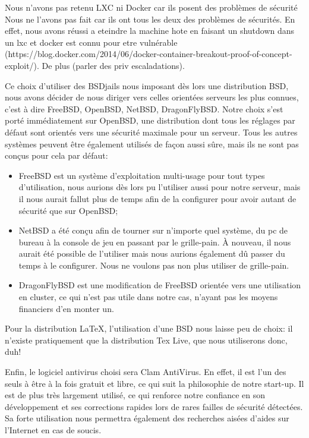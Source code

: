 \documentclass[10pt,a4paper]{article}
\begin{document}
Nous n'avons pas retenu LXC ni Docker car ils posent des problèmes de sécurité
Nous ne l'avons pas fait car ils ont tous les deux des problèmes de sécurités.
En effet, nous avons réussi a eteindre la machine hote en faisant un shutdown dans un lxc et docker est connu pour etre vulnérable (https://blog.docker.com/2014/06/docker-container-breakout-proof-of-concept-exploit/).
De plus (parler des priv escaladations).


Ce choix d'utiliser des BSDjails nous imposant dès lors une distribution BSD, nous avons décider de nous diriger vers celles orientées serveurs les plus connues,
c'est à dire FreeBSD, OpenBSD, NetBSD, DragonFlyBSD.
Notre choix s'est porté immédiatement sur OpenBSD, une distribution dont tous les réglages par défaut sont orientés vers une sécurité maximale pour un serveur.
Tous les autres systèmes peuvent être également utilisés de façon aussi sûre, mais ils ne sont pas conçus pour cela par défaut:
\begin{itemize}
    \item FreeBSD est un système d'exploitation multi-usage pour tout types d'utilisation, nous aurions dès lors pu l'utiliser aussi pour notre serveur, mais il nous aurait fallut plus de temps afin de la configurer pour avoir autant de sécurité que sur OpenBSD;
    \item NetBSD a été conçu afin de tourner sur n'importe quel système, du pc de bureau à la console de jeu en passant par le grille-pain. À nouveau, il nous aurait été possible de l'utiliser mais nous aurions également dû passer du temps à le configurer. Nous ne voulons pas non plus utiliser de grille-pain.
    \item DragonFlyBSD est une modification de FreeBSD orientée vers une utilisation en cluster, ce qui n'est pas utile dans notre cas, n'ayant pas les moyens financiers d'en monter un.
\end{itemize}

Pour la distribution \LaTeX, l'utilisation d'une BSD nous laisse peu de choix: il n'existe pratiquement que la distribution Tex Live, que nous utiliserons donc, duh! %

Enfin, le logiciel antivirus choisi sera Clam AntiVirus.
En effet, il est l'un des seuls à être à la fois gratuit et libre, ce qui suit la philosophie de notre start-up.
Il est de plus très largement utilisé, ce qui renforce notre confiance en son développement et ses corrections rapides lors de rares failles de sécurité détectées.
Sa forte utilisation nous permettra également des recherches aisées d'aides sur l'Internet en cas de soucis.
\end{document}
